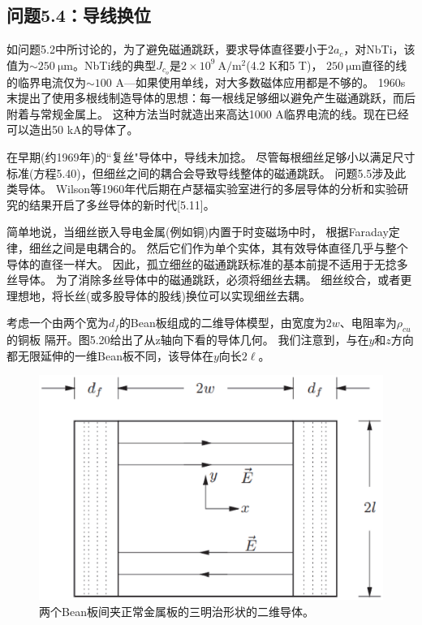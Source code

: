 \subsection{问题5.4：导线换位}
如问题5.2中所讨论的，为了避免磁通跳跃，要求导体直径要小于$2a_c$，对NbTi，该值为$\sim 250\ \mathrm{\mu m}$。NbTi线的典型$J_{c_o}$是$2\times 10^9\ \mathrm{A/m^2}$(4.2 K和5 T)，
$250\ \mathrm{\mu m}$直径的线的临界电流仅为$\sim 100$ A---如果使用单线，对大多数磁体应用都是不够的。
1960s末提出了使用多根线制造导体的思想：每一根线足够细以避免产生磁通跳跃，而后附着与常规金属上。
这种方法当时就造出来高达1000 A临界电流的线。现在已经可以造出50 kA的导体了。

在早期(约1969年)的``复丝"导体中，导线未加捻。
尽管每根细丝足够小以满足尺寸标准(方程5.40)，但细丝之间的耦合会导致导线整体的磁通跳跃。
问题5.5涉及此类导体。
Wilson等1960年代后期在卢瑟福实验室进行的多层导体的分析和实验研究的结果开启了多丝导体的新时代[5.11]。

简单地说，当细丝嵌入导电金属(例如铜)内置于时变磁场中时，
根据Faraday定律，细丝之间是电耦合的。
然后它们作为单个实体，其有效导体直径几乎与整个导体的直径一样大。
因此，孤立细丝的磁通跳跃标准的基本前提不适用于无捻多丝导体。
为了消除多丝导体中的磁通跳跃，必须将细丝去耦。
细丝绞合，或者更理想地，将长丝(或多股导体的股线)换位可以实现细丝去耦。

考虑一个由两个宽为$d_f$的Bean板组成的二维导体模型，由宽度为$2w$、电阻率为$\rho_{cu}$的铜板
隔开。图5.20给出了从z轴向下看的导体几何。
我们注意到，与在$y$和$z$方向都无限延伸的一维Bean板不同，该导体在$y$向长$2\ell$。

\begin{figure}
	\centering
	\includegraphics[scale=0.6]{chpt5/figs/fig5.20.eps}
	\caption{两个Bean板间夹正常金属板的三明治形状的二维导体。}
\end{figure}

